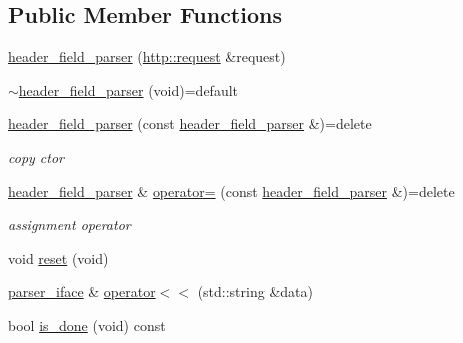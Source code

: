 \subsection*{Public Member Functions}
\begin{DoxyCompactItemize}
\item 
\hyperlink{classnetflex_1_1parsing_1_1header__field__parser_a619dc1b993b03073151e3793f2b91bb8}{header\+\_\+field\+\_\+parser} (\hyperlink{classnetflex_1_1http_1_1request}{http\+::request} \&request)
\item 
\hyperlink{classnetflex_1_1parsing_1_1header__field__parser_aa60216c4b9e8c53448402a9cdaf5c495}{$\sim$header\+\_\+field\+\_\+parser} (void)=default
\item 
\mbox{\label{classnetflex_1_1parsing_1_1header__field__parser_ad98f22575070c9e2049fae7a39c8b195}} 
\hyperlink{classnetflex_1_1parsing_1_1header__field__parser_ad98f22575070c9e2049fae7a39c8b195}{header\+\_\+field\+\_\+parser} (const \hyperlink{classnetflex_1_1parsing_1_1header__field__parser}{header\+\_\+field\+\_\+parser} \&)=delete
\begin{DoxyCompactList}\small\item\em copy ctor \end{DoxyCompactList}\item 
\mbox{\label{classnetflex_1_1parsing_1_1header__field__parser_ac34cdac6009d810413b3e7ba3df9dd96}} 
\hyperlink{classnetflex_1_1parsing_1_1header__field__parser}{header\+\_\+field\+\_\+parser} \& \hyperlink{classnetflex_1_1parsing_1_1header__field__parser_ac34cdac6009d810413b3e7ba3df9dd96}{operator=} (const \hyperlink{classnetflex_1_1parsing_1_1header__field__parser}{header\+\_\+field\+\_\+parser} \&)=delete
\begin{DoxyCompactList}\small\item\em assignment operator \end{DoxyCompactList}\item 
void \hyperlink{classnetflex_1_1parsing_1_1header__field__parser_a8c77c07cd5ec5c4f4c5961359b648768}{reset} (void)
\item 
\hyperlink{classnetflex_1_1parsing_1_1parser__iface}{parser\+\_\+iface} \& \hyperlink{classnetflex_1_1parsing_1_1header__field__parser_a9b8f37ee50747394ff9740f36b6ac150}{operator$<$$<$} (std\+::string \&data)
\item 
bool \hyperlink{classnetflex_1_1parsing_1_1header__field__parser_a59cc97a4d2104217d23a4d54a31f072f}{is\+\_\+done} (void) const
\end{DoxyCompactItemize}
